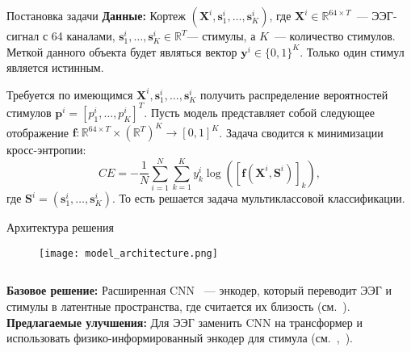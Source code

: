 \documentclass{beamer}
\begin{document}
\begin{frame}{Постановка задачи}
\textbf{Данные:} Кортеж $(\mathbf{X}^i, \mathbf{s}_1^i, \dots, \mathbf{s}_K^i)$, где $\mathbf{X}^i \in \mathbb{R}^{64 \times T}$~--- ЭЭГ-сигнал с 64 каналами, $\mathbf{s}_1^i, \dots, \mathbf{s}_K^i \in \mathbb{R}^{T}$--- стимулы, а $K$~--- количество стимулов. Меткой данного объекта будет являться вектор $\mathbf{y}^i \in \{0, 1\}^K$. Только один стимул является истинным. \bigskip

Требуется по имеющимся $\mathbf{X}^i, \mathbf{s}_1^i, \dots, \mathbf{s}_K^i$ получить распределение вероятностей стимулов $\mathbf{p}^i = [p_1^i, \dots , p_K^i]^T$. Пусть модель представляет собой следующее отображение $\mathbf{f} : \mathbb{R}^{64 \times T} \times \left( \mathbb{R}^{T} \right)^K \rightarrow [0, 1]^K$. Задача сводится к минимизации кросс-энтропии:
    $$CE = - \frac{1}{N}\sum_{i=1}^N\sum_{k=1}^K y_k^i \log \left( \left[ \mathbf{f}(\mathbf{X}^i, \mathbf{S}^i) \right]_k \right),$$
    где $\mathbf{S}^i = (\mathbf{s}^i_1, \dots, \mathbf{s}^i_K)$. То есть решается задача мультиклассовой классификации.

\end{frame}
\begin{frame}{Архитектура решения}
\begin{figure}[t]
        \centering
        \texttt{[image: model\_architecture.png]}
\end{figure}
\begin{columns}[c]
     \textbf{Базовое решение:} Расширенная CNN ~--- энкодер, который переводит ЭЭГ и стимулы в латентные пространства, где считается их близость (см.~\citep{Accou2021ModelingTR}).
     \textbf{Предлагаемые улучшения:}
     Для ЭЭГ заменить CNN на трансформер и использовать физико-информированный энкодер для стимула (см.~\citep{multihead-gru},~\citep{Wang2024SelfsupervisedSR}). 
\end{columns}
\end{frame}
\end{document}
